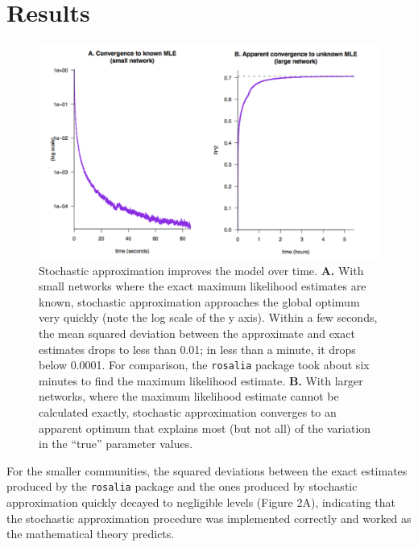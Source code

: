 \section{Results}\label{results}

\begin{figure}[htbp]
\centering
\includegraphics{convergence.pdf}
\caption{Stochastic approximation improves the model over time.
\textbf{A.} With small networks where the exact maximum likelihood
estimates are known, stochastic approximation approaches the global
optimum very quickly (note the log scale of the y axis). Within a few
seconds, the mean squared deviation between the approximate and exact
estimates drops to less than 0.01; in less than a minute, it drops below
0.0001. For comparison, the \texttt{rosalia} package took about six
minutes to find the maximum likelihood estimate. \textbf{B.} With larger
networks, where the maximum likelihood estimate cannot be calculated
exactly, stochastic approximation converges to an apparent optimum that
explains most (but not all) of the variation in the ``true'' parameter
values.}
\end{figure}

For the smaller communities, the squared deviations between the exact
estimates produced by the \texttt{rosalia} package and the ones produced
by stochastic approximation quickly decayed to negligible levels (Figure
2A), indicating that the stochastic approximation procedure was
implemented correctly and worked as the mathematical theory predicts.

